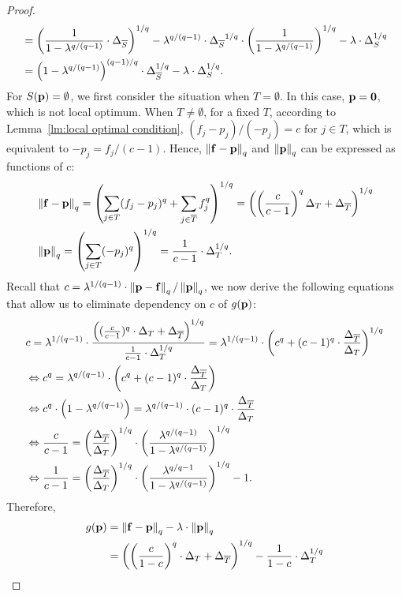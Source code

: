 \begin{proof}
\begin{align*}
&=\left(\frac{1}{1-\lambda^{q/(q-1)}}\cdot{\Delta_{{\overline{S}}}}\right)^{1/q}-\lambda^{q/(q-1)}\cdot {\Delta_{{\overline{S}}}}^{1/q}\cdot\left(\frac{1}{1-\lambda^{q/(q-1)}}\right)^{1/q}-\lambda\cdot\Delta_{{S}}^{1/q}\\
&=\left(1-\lambda^{q/(q-1)}\right)^{(q-1)/q}\cdot\Delta_{\overline{S}}^{1/q}-\lambda\cdot\Delta_{S}^{1/q}.
\end{align*}
For $S(\mathbf{p})=\emptyset$, we first consider the situation when $T=\emptyset$. In this case, $\mathbf{p}=\mathbf{0}$, which is not local optimum. When $T\neq\emptyset$, for a fixed $T$, according to Lemma~\ref{lm:local optimal condition}, $(f_j-p_j)/(-p_j)=c$ for $j\in T$, which is equivalent to $-p_j=f_j/(c-1)$. Hence, $\left\Vert \mathbf{f}-\mathbf{p}\right\Vert_{q}$ and $\left\Vert \mathbf{p}\right\Vert_{q}$ can be expressed as functions of c:
\begin{align*}
&\left\Vert \mathbf{f}-\mathbf{p}\right\Vert_{q}=\left(\sum_{j\in T}(f_j-p_j)^q+\sum_{j\in \overline{T}}f_j^q\right)^{1/q}=\left(\left(\frac{c}{c-1}\right)^q\Delta_{{T}}+{\Delta_{{\overline{T}}}}\right)^{1/q}\\
&\left\Vert \mathbf{p}\right\Vert_{q}=\left(\sum_{j\in T}(-p_j)^q\right)^{1/q}=\frac{1}{c-1}\cdot\Delta_{{T}}^{1/q}.
\end{align*}
Recall that $c=\lambda^{1/(q-1)}\cdot\left\Vert \mathbf{p}-\mathbf{f}\right\Vert_{q}/\left\Vert \mathbf{p}\right\Vert_{q}$, we now derive the following equations that allow us to eliminate dependency on $c$ of $g(\mathbf{p})$:
\begin{align*}
&c=\lambda^{1/(q-1)}\cdot\frac{\left((\frac{c}{c-1})^q\cdot\Delta_{{T}}+{\Delta_{{\overline{T}}}}\right)^{1/q}}{\frac{1}{c-1}\cdot\Delta_{{T}}^{1/q}}=\lambda^{1/(q-1)}\cdot\left(c^q+(c-1)^q\cdot\frac{{\Delta_{{\overline{T}}}}}{\Delta_{{T}}}\right)^{1/q}\\
&\Leftrightarrow c^q=\lambda^{q/(q-1)}\cdot\left(c^q+(c-1)^q\cdot\frac{{\Delta_{{\overline{T}}}}}{\Delta_{{T}}}\right)\\
&\Leftrightarrow c^q\cdot\left(1-\lambda^{q/(q-1)}\right)=\lambda^{q/(q-1)}\cdot(c-1)^q\cdot\frac{{\Delta_{{\overline{T}}}}}{\Delta_{{T}}}\\
&\Leftrightarrow\frac{c}{c-1}=\left(\frac{{\Delta_{{\overline{T}}}}}{\Delta_{{T}}}\right)^{1/q}\cdot\left(\frac{\lambda^{q/(q-1)}}{1-\lambda^{q/(q-1)}}\right)^{1/q}\\
&\Leftrightarrow\frac{1}{c-1}=\left(\frac{{\Delta_{{\overline{T}}}}}{\Delta_{{T}}}\right)^{1/q}\cdot\left(\frac{\lambda^{q/{q-1}}}{1-\lambda^{q/(q-1)}}\right)^{1/q}-1.
\end{align*}
Therefore,
\begin{align*}
g(\loc)&=\qnorm{\facility-\loc}-\lambda\cdot\qnorm{\loc}\\
&=\left(\left(\frac{c}{1-c}\right)^q\cdot\energyT+\energyTc\right)^{1/q}-\frac{1}{1-c}\cdot\energyT^{1/q}\\

\end{align*}
\end{proof}
